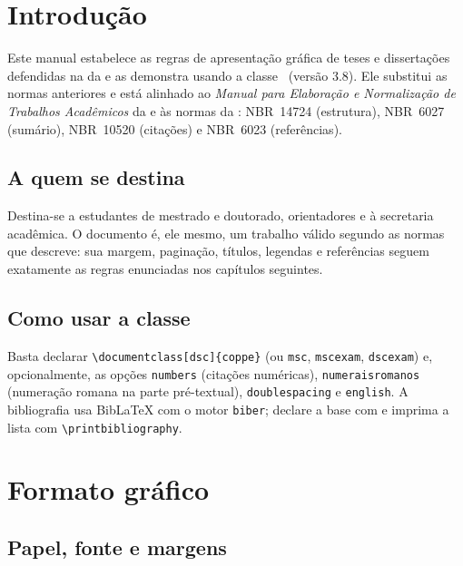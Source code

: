 \documentclass[dsc]{coppe}
\begin{document}
  \listoffigures
  \listoftables
  \listofquadros
  \listofprogramas
  \listofalgorithms
  \printloabbreviations
  \printlosymbols
  \tableofcontents

  \mainmatter

  \chapter{Introdução}

  Este manual estabelece as regras de apresentação gráfica de teses e
  dissertações defendidas na  da  e as demonstra usando
  a classe \CoppeTeX\ (versão 3.8). Ele substitui as normas anteriores e está
  alinhado ao \emph{Manual para Elaboração e Normalização de Trabalhos
  Acadêmicos} da  e às normas da : \mbox{NBR~14724}
  (estrutura), \mbox{NBR~6027} (sumário), \mbox{NBR~10520} (citações) e
  \mbox{NBR~6023} (referências).

  \section{A quem se destina}

  Destina-se a estudantes de mestrado e doutorado, orientadores e à secretaria
  acadêmica. O documento é, ele mesmo, um trabalho válido segundo as normas que
  descreve: sua margem, paginação, títulos, legendas e referências seguem
  exatamente as regras enunciadas nos capítulos seguintes.

  \section{Como usar a classe \CoppeTeX}

  Basta declarar \verb|\documentclass[dsc]{coppe}| (ou \verb|msc|, \verb|mscexam|,
  \verb|dscexam|) e, opcionalmente, as opções \verb|numbers| (citações
  numéricas), \verb|numeraisromanos| (numeração romana na parte pré-textual),
  \verb|doublespacing| e \verb|english|. A bibliografia usa BibLaTeX com o motor
  \texttt{biber}; declare a base com \verb|| e imprima a lista com
  \verb|\printbibliography|.

  \chapter{Formato gráfico}

  \section{Papel, fonte e margens}
\end{document}
